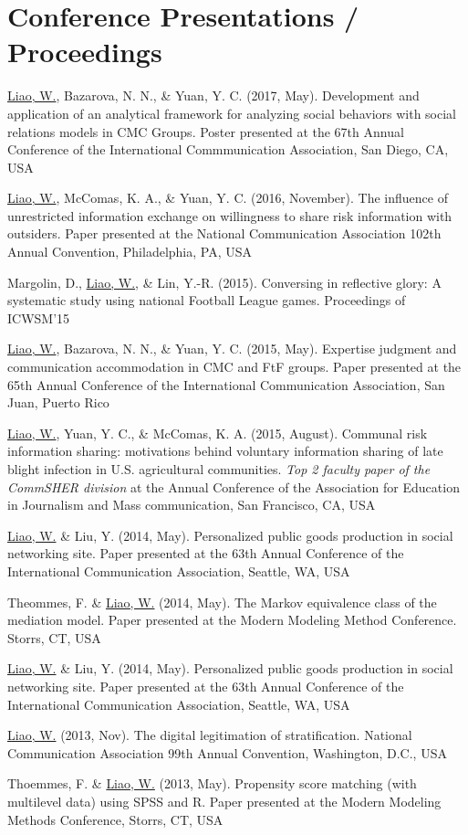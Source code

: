 \documentclass[11pt, letterpaper]{article} %
\newcommand{\years}[1]{\leavevmode\marginnote{\scriptsize #1}} %
\begin{document}
\section*{Conference Presentations / Proceedings}
\begin{hangparas}{.25in}{1}

\underline{Liao, W.}, \years{2017} Bazarova, N. N., \& Yuan, Y. C. (2017, May). Development and application of an analytical framework for analyzing social behaviors with social relations models in CMC Groups. Poster presented at the 67th Annual Conference of the International Commmunication Association, San Diego, CA, USA

\underline{Liao, W.}, \years{2016} McComas, K. A., \& Yuan, Y. C. (2016, November). The influence of unrestricted information exchange on willingness to share risk information with outsiders. Paper presented at the National Communication Association 102th Annual Convention, Philadelphia, PA, USA

Margolin, D., \years{2015} \underline{Liao, W.}, \& Lin, Y.-R. (2015). Conversing in reflective glory: A systematic study using national Football League games. Proceedings of ICWSM’15

\underline{Liao, W.}, Bazarova, N. N., \& Yuan, Y. C. (2015, May). Expertise judgment and communication accommodation in CMC and FtF groups. Paper presented at the 65th Annual Conference of the International Communication Association, San Juan, Puerto Rico

\underline{Liao, W.}, Yuan, Y. C., \& McComas, K. A. (2015, August). Communal risk information sharing: motivations behind voluntary information sharing of late blight infection in U.S. agricultural communities. \textsl{Top 2 faculty paper of the CommSHER division} at the Annual Conference of the Association for Education in Journalism and Mass communication, San Francisco, CA, USA

\underline{Liao, W.} \years{2012-2014}\& Liu, Y. (2014, May). Personalized public goods production in social networking site. Paper presented at the 63th Annual Conference of the International Communication Association, Seattle, WA, USA

Theommes, F. \& \underline{Liao, W.} (2014, May). The Markov equivalence class of the mediation model. Paper presented at the Modern Modeling Method Conference. Storrs, CT, USA

\underline{Liao, W.} \& Liu, Y. (2014, May). Personalized public goods production in social networking site. Paper presented at the 63th Annual Conference of the International Communication Association, Seattle, WA, USA

\underline{Liao, W.} (2013, Nov). The digital legitimation of stratification. National Communication Association 99th Annual Convention, Washington, D.C., USA

Thoemmes, F. \& \underline{Liao, W.} (2013, May). Propensity score matching (with multilevel data) using SPSS and R. Paper presented at the Modern Modeling Methods Conference, Storrs, CT, USA
\end{hangparas}
\end{document}
